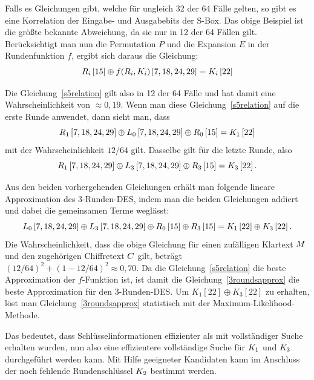 Falls es Gleichungen gibt, welche für ungleich 32 der 64 Fälle gelten, so gibt es eine Korrelation der Eingabe- und Ausgabebits der S-Box. Das obige Beispiel ist die größte bekannte Abweichung, da sie nur in 12 der 64 Fällen gilt. Berücksichtigt man nun die Permutation $P$ und die Expansion $E$ in der Rundenfunktion $f$, ergibt sich daraus die Gleichung:
\begin{equation}
	R_i\left[ 15\right] \oplus f(R_i,K_i)\left[ 7,18,24,29\right] = K_i\left[ 22\right]
	\label{s5relation}
\end{equation}

Die Gleichung~\ref{s5relation} gilt also in 12 der 64 Fälle und hat damit eine Wahrscheinlichkeit von $\approx 0{,}19$. Wenn man diese Gleichung~\ref{s5relation}
auf die erste Runde anwendet, dann sieht man, dass
\begin{equation}
	R_1\left[ 7,18,24,29\right] \oplus L_0\left[ 7,18,24,29\right] \oplus R_0\left[ 15 \right] = K_1 \left[ 22 \right]
\end{equation}
mit der Wahrscheinlichkeit $12/64$ gilt. Dasselbe gilt für die letzte Runde, also
\begin{equation}
	R_1\left[ 7,18,24,29\right] \oplus L_3\left[ 7,18,24,29\right] \oplus R_3\left[ 15 \right] = K_3 \left[ 22 \right].
\end{equation}

Aus den beiden vorhergehenden Gleichungen erhält man folgende lineare Approximation des 3-Runden-DES, indem man die beiden Gleichungen addiert und dabei die gemeinsamen Terme weglässt:
\begin{equation}
	L_0\left[ 7,18,24,29\right] \oplus L_3\left[ 7,18,24,29\right] \oplus R_0\left[ 15 \right] \oplus R_3\left[ 15 \right] = K_1 \left[ 22 \right] \oplus K_3\left[ 22 \right].
	\label{3roundsapprox}
\end{equation}
Die Wahrscheinlichkeit, dass die obige Gleichung für einen zufälligen Klartext $M$ und den zugehörigen Chiffretext $C$ gilt, beträgt
$(12/64)^2+(1-12/64)^2 \approx 0{,}70$. Da die Gleichung~\ref{s5relation} die beste Approximation der $f$-Funktion ist, ist damit die
Gleichung~\ref{3roundsapprox} die beste Approximation für den 3-Runden-DES. Um $K_1\left[ 22\right] \oplus K_3\left[ 22\right]$
zu erhalten, löst man Gleichung~\ref{3roundsapprox} statistisch mit der Maximum-Likelihood-Methode.

Das bedeutet, dass Schlüsselinformationen effizienter als mit vollständiger Suche erhalten wurden, nun also eine effizientere vollständige Suche für $K_1$ und $K_3$
durchgeführt werden kann. Mit Hilfe geeigneter Kandidaten kann im Anschluss der noch fehlende Rundenschlüssel $K_2$ bestimmt werden.

